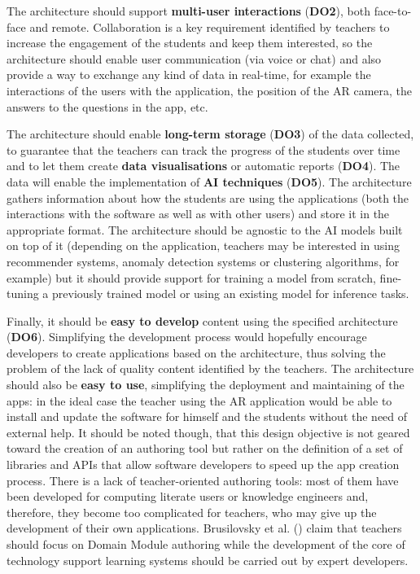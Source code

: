 The architecture should support \textbf{multi-user interactions} (\textbf{DO2}), both face-to-face and remote. Collaboration is a key requirement identified by teachers to increase the engagement of the students and keep them interested, so the architecture should enable user communication (via voice or chat) and also provide a way to exchange any kind of data in real-time, for example the interactions of the users with the application, the position of the AR camera, the answers to the questions in the app, etc.

The architecture should enable \textbf{long-term storage} (\textbf{DO3}) of the data collected, to guarantee that the teachers can track the progress of the students over time and to let them create \textbf{data visualisations} or automatic reports (\textbf{DO4}). The data will enable the implementation of \textbf{AI techniques} (\textbf{DO5}). The architecture gathers information about how the students are using the applications (both the interactions with the software as well as with other users) and store it in the appropriate format. The architecture should be agnostic to the AI models built on top of it (depending on the application, teachers may be interested in using recommender systems, anomaly detection systems or clustering algorithms, for example) but it should provide support for training a model from scratch, fine-tuning a previously trained model or using an existing model for inference tasks.

Finally, it should be \textbf{easy to develop} content using the specified architecture (\textbf{DO6}). Simplifying the development process would hopefully encourage developers to create applications based on the architecture, thus solving the problem of the lack of quality content identified by the teachers. The architecture should also be \textbf{easy to use}, simplifying the deployment and maintaining of the apps: in the ideal case the teacher using the AR application would be able to install and update the software for himself and the students without the need of external help. It should be noted though, that this design objective is not geared toward the creation of an authoring tool but rather on the definition of a set of libraries and APIs that allow software developers to speed up the app creation process. There is a lack of teacher-oriented authoring tools: most of them have been developed for computing literate users or knowledge engineers and, therefore, they become too complicated for teachers, who may give up the development of their own applications. Brusilovsky et al. (\citeyear{brusilovsky2003adaptive}) claim that teachers should focus on Domain Module authoring while the development of the core of technology support learning systems should be carried out by expert developers.

